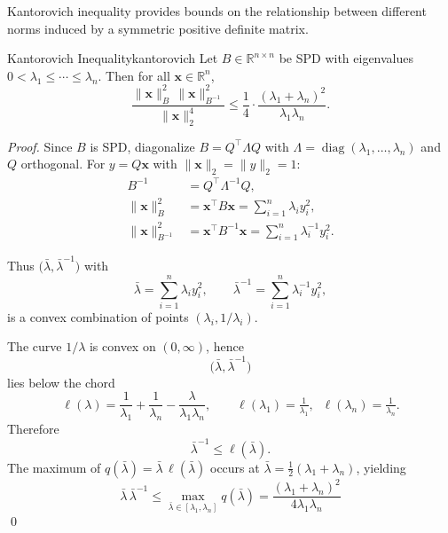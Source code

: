 \documentclass[../../main.tex]{subfiles}
\begin{document}
Kantorovich inequality provides bounds on the relationship between different norms induced by a symmetric positive definite matrix.
\begin{theorem}{Kantorovich Inequality}{kantorovich}
    Let $B \in \mathbb{R}^{n \times n}$ be SPD with eigenvalues $0 < \lambda_1 \leq \cdots \leq \lambda_n.$
    Then for all $\mathbf{x} \in \mathbb{R}^n$,
    \[
        \frac{\|\mathbf{x}\|_B^2 \,\|\mathbf{x}\|_{B^{-1}}^2}{\|\mathbf{x}\|_2^4}
        \leq \frac{1}{4}\cdot\frac{(\lambda_1 + \lambda_n)^2}{\lambda_1 \lambda_n}.
    \]
\end{theorem}
\begin{proof}
    Since $B$ is SPD, diagonalize $B = Q^{\top}\Lambda Q$ with $\Lambda = \operatorname{diag}(\lambda_1, \ldots, \lambda_n)$ and $Q$ orthogonal.
    For $y = Q\mathbf{x}$ with $\|\mathbf{x}\|_2 = \|y\|_2 = 1$:
    \begin{align*}
        B^{-1}                    & = Q^{\top} \Lambda^{-1} Q,                                                 \\
        \|\mathbf{x}\|_B^2        & = \mathbf{x}^{\top} B \mathbf{x} = \sum_{i=1}^n \lambda_i y_i^2,           \\
        \|\mathbf{x}\|_{B^{-1}}^2 & = \mathbf{x}^{\top} B^{-1} \mathbf{x} = \sum_{i=1}^n \lambda_i^{-1} y_i^2.
    \end{align*}

    Thus $\big(\bar\lambda, \bar\lambda^{-1}\big)$ with
    \[
        \bar\lambda = \sum_{i=1}^n \lambda_i y_i^2,
        \qquad
        \bar\lambda^{-1} = \sum_{i=1}^n \lambda_i^{-1} y_i^2,
    \]
    is a convex combination of points $(\lambda_i, 1/\lambda_i)$.

    The curve $1/\lambda$ is convex on $(0,\infty)$, hence
    \[
        \big(\bar\lambda, \bar\lambda^{-1}\big)
    \]
    lies below the chord
    \[
        \ell(\lambda) = \frac{1}{\lambda_1} + \frac{1}{\lambda_n} - \frac{\lambda}{\lambda_1 \lambda_n},
        \qquad \ell(\lambda_1) = \tfrac{1}{\lambda_1}, \;\; \ell(\lambda_n) = \tfrac{1}{\lambda_n}.
    \]
    Therefore
    \[
        \bar\lambda^{-1} \leq \ell(\bar\lambda).
    \]
    The maximum of $q(\bar\lambda) = \bar\lambda\,\ell(\bar\lambda)$ occurs at $\bar\lambda = \tfrac{1}{2}(\lambda_1 + \lambda_n)$, yielding
    \[
        \bar\lambda \,\bar\lambda^{-1} \leq \max_{\bar\lambda \in [\lambda_1, \lambda_n]} q(\bar\lambda) = \frac{(\lambda_1 + \lambda_n)^2}{4 \lambda_1 \lambda_n}
    \]\qed
\end{proof}
\end{document}

